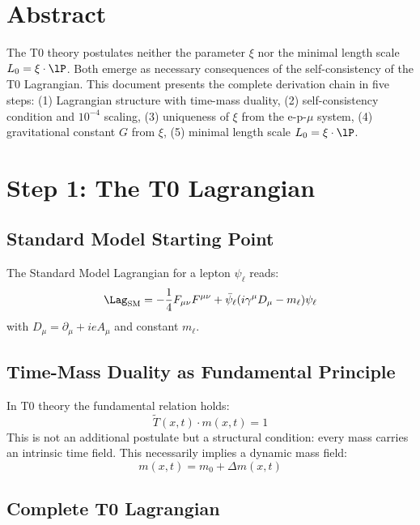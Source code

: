 \section*{Abstract}

The T0 theory postulates neither the parameter $\xi$ nor the minimal length scale $L_0 = \xi \cdot \lP$. Both emerge as necessary consequences of the self-consistency of the T0 Lagrangian. This document presents the complete derivation chain in five steps: (1) Lagrangian structure with time-mass duality, (2) self-consistency condition and $10^{-4}$ scaling, (3) uniqueness of $\xi$ from the e-p-$\mu$ system, (4) gravitational constant $G$ from $\xi$, (5) minimal length scale $L_0 = \xi \cdot \lP$.

\section{Step 1: The T0 Lagrangian}

\subsection{Standard Model Starting Point}

The Standard Model Lagrangian for a lepton $\psi_\ell$ reads:
\begin{equation}
	\Lag_{\text{SM}} = -\frac{1}{4} F_{\mu\nu}F^{\mu\nu} + \bar{\psi}_\ell(i\gamma^\mu D_\mu - m_\ell)\psi_\ell
\end{equation}
with $D_\mu = \partial_\mu + ieA_\mu$ and constant $m_\ell$.

\subsection{Time-Mass Duality as Fundamental Principle}

In T0 theory the fundamental relation holds:
\begin{equation}
	\tilde{T}(x,t) \cdot m(x,t) = 1
\end{equation}
This is not an additional postulate but a structural condition: every mass carries an intrinsic time field. This necessarily implies a dynamic mass field:
\begin{equation}
	m(x,t) = m_0 + \Delta m(x,t)
\end{equation}

\subsection{Complete T0 Lagrangian}

